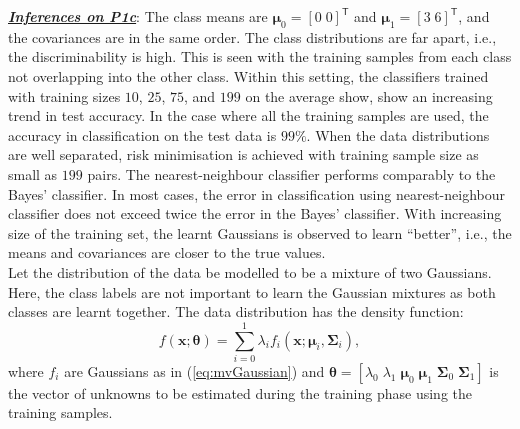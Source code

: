\documentclass[12pt, a4 paper]{article}
\newcommand{\bx}{\mathbf{x}}
\newcommand{\TT}{\mathsf{T}}
\newcommand{\bmu}{\boldsymbol{\mu}}
\newcommand{\btheta}{\boldsymbol{\theta}}
\newcommand{\bSigma}{\boldsymbol{\Sigma}}
\begin{document}
\underline {\it \bfseries Inferences on P1c}: The class means are $\bmu_{0} = [0 \; 0]^{\TT}$ and $\bmu_{1} = [3 \; 6]^{\TT}$, and the covariances are in the same order. The class distributions are far apart, i.e., the discriminability is high. This is seen with the training samples from each class not overlapping into the other class. Within this setting, the classifiers trained with training sizes $10$, $25$, $75$, and $199$ on the average show, show an increasing trend in test accuracy. In the case where all the training samples are used, the accuracy in classification on the test data is $99\%$. When the data distributions are well separated, risk minimisation is achieved with training sample size as small as $199$ pairs. The nearest-neighbour classifier performs comparably to the Bayes' classifier. In most cases, the error in classification using nearest-neighbour classifier does not exceed twice the error in the Bayes' classifier. With increasing size of the training set, the learnt Gaussians is observed to learn ``better'', i.e., the means and covariances are closer to the true values. \\


\label{prob:1.2}
Let the distribution of the data be modelled to be a mixture of two Gaussians. Here, the class labels are not important to learn the Gaussian mixtures as both classes are learnt together. The data distribution has the density function:
\begin{equation}
	f(\bx; \btheta) = \sum_{i=0}^{1} \lambda_{i} f_{i}(\bx; \bmu_{i}, \bSigma_{i}),
\label{eq:gmmModel}
\end{equation}
where $f_{i}$ are Gaussians as in (\ref{eq:mvGaussian}) and $\btheta = [\lambda_{0} \; \lambda_{1} \; \bmu_{0} \; \bmu_{1} \; \bSigma_{0} \; \bSigma_{1}]$ is the vector of unknowns to be estimated during the training phase using the training samples. \\
\end{document}
